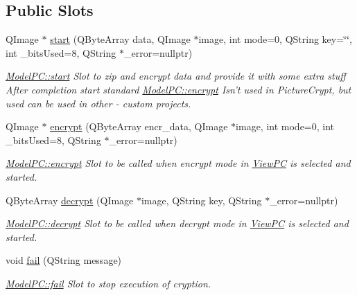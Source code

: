 \subsection*{Public Slots}
\begin{DoxyCompactItemize}
\item 
Q\-Image $\ast$ \hyperlink{class_model_p_c_a3cae34fd5bcb06e8c1f8cfe7961bd270}{start} (Q\-Byte\-Array data, Q\-Image $\ast$image, int mode=0, Q\-String key=\char`\"{}\char`\"{}, int \-\_\-bits\-Used=8, Q\-String $\ast$\-\_\-error=nullptr)
\begin{DoxyCompactList}\small\item\em \hyperlink{class_model_p_c_a3cae34fd5bcb06e8c1f8cfe7961bd270}{Model\-P\-C\-::start} Slot to zip and encrypt data and provide it with some extra stuff After completion start standard \hyperlink{class_model_p_c_a48667f5b1a547d03a3def2d3db5a220f}{Model\-P\-C\-::encrypt} Isn't used in Picture\-Crypt, but used can be used in other -\/ custom projects. \end{DoxyCompactList}\item 
Q\-Image $\ast$ \hyperlink{class_model_p_c_a48667f5b1a547d03a3def2d3db5a220f}{encrypt} (Q\-Byte\-Array encr\-\_\-data, Q\-Image $\ast$image, int mode=0, int \-\_\-bits\-Used=8, Q\-String $\ast$\-\_\-error=nullptr)
\begin{DoxyCompactList}\small\item\em \hyperlink{class_model_p_c_a48667f5b1a547d03a3def2d3db5a220f}{Model\-P\-C\-::encrypt} Slot to be called when encrypt mode in \hyperlink{class_view_p_c}{View\-P\-C} is selected and started. \end{DoxyCompactList}\item 
Q\-Byte\-Array \hyperlink{class_model_p_c_a9458c3a1e369a64889d9a1f70e0c1d18}{decrypt} (Q\-Image $\ast$image, Q\-String key, Q\-String $\ast$\-\_\-error=nullptr)
\begin{DoxyCompactList}\small\item\em \hyperlink{class_model_p_c_a9458c3a1e369a64889d9a1f70e0c1d18}{Model\-P\-C\-::decrypt} Slot to be called when decrypt mode in \hyperlink{class_view_p_c}{View\-P\-C} is selected and started. \end{DoxyCompactList}\item 
void \hyperlink{class_model_p_c_a47464b59b7e37fcee25e55475708aabd}{fail} (Q\-String message)
\begin{DoxyCompactList}\small\item\em \hyperlink{class_model_p_c_a47464b59b7e37fcee25e55475708aabd}{Model\-P\-C\-::fail} Slot to stop execution of cryption. \end{DoxyCompactList}\end{DoxyCompactItemize}
